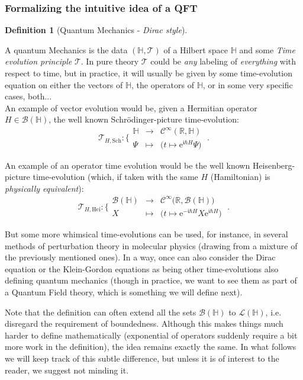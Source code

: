 \documentclass[a4paper,11pt]{article}
\numberwithin{equation}{section}
\theoremstyle{definition}
\newtheorem{definition}{Definition}
\newcommand{\e}{{\mathrm{e}}}
\begin{document}
\subsubsection{Formalizing the intuitive idea of a QFT}
\begin{definition}[Quantum Mechanics - \emph{Dirac style}]$\quad$

A quantum Mechanics is the data $(\mathbb{H},\mathcal{T})$ of a Hilbert space $\mathbb{H}$ and some \emph{Time evolution principle} $\mathcal{T}$. In pure theory $\mathcal{T}$ could be \emph{any} labeling of \emph{everything} with respect to time, but in practice, it will usually be given by some time-evolution equation on either the vectors of $\mathbb{H}$, the operators of $\mathbb{H}$, or in some very specific cases, both...\\
An example of vector evolution would be, given a Hermitian operator $H\in\mathcal{B}(\mathbb{H})$, the well known Schrödinger-picture time-evolution:
$$\boxed{\mathcal{T}_{H,\mathrm{Sch}}: \Bigg\{
\begin{matrix}
\mathbb{H} & \to & \mathcal{C}^\infty(\mathbb{R},\mathbb{H})\\
\Psi & \mapsto & \Big(t\mapsto \e^{\mathfrak{i}\hbar H}\Psi\Big)
\end{matrix}}\;.$$

An example of an operator time evolution would be the well known Heisenberg-picture time-evolution (which, if taken with the same $H$ (Hamiltonian) is \emph{physically equivalent}):
$$\boxed{\mathcal{T}_{H,\mathrm{Hei}}: \Bigg\{
\begin{matrix}
\mathcal{B}(\mathbb{H}) & \to & \mathcal{C}^\infty\big(\mathbb{R},\mathcal{B}(\mathbb{H})\big)\\
X & \mapsto & \Big(t\mapsto \e^{-\mathfrak{i}\hbar H}X\e^{\mathfrak{i}\hbar H}\Big)
\end{matrix}}\;.$$

But some more whimsical time-evolutions can be used, for instance, in several methods of perturbation theory in molecular physics (drawing from a mixture of the previously mentioned ones). In a way, once can also consider the Dirac equation or the Klein-Gordon equations as being other time-evolutions also defining quantum mechanics (though in practice, we want to see them as part of a Quantum Field theory, which is something we will define next).

Note that the definition can often extend all the sets $\mathcal{B}(\mathbb{H})$ to $\mathcal{L}(\mathbb{H})$, i.e. disregard the requirement of boundedness. Although this makes things much harder to define mathematically (exponential of operators suddenly require a bit more work in the definition), the idea remains exactly the same. In what follows we will keep track of this subtle difference, but unless it is of interest to the reader, we suggest not minding it.
\end{definition}
\end{document}
